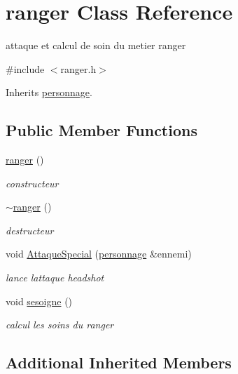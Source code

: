\hypertarget{classranger}{}\section{ranger Class Reference}
\label{classranger}


attaque et calcul de soin du metier ranger  




{\ttfamily \#include $<$ranger.\+h$>$}



Inherits \mbox{\hyperlink{classpersonnage}{personnage}}.

\subsection*{Public Member Functions}
\begin{DoxyCompactItemize}
\item 
\mbox{\hyperlink{classranger_a6f1936af8add92374cff7cf6c61264a2}{ranger}} ()
\begin{DoxyCompactList}\small\item\em constructeur \end{DoxyCompactList}\item 
\mbox{\hyperlink{classranger_af74328483dc87135af349240b1c4fbc3}{$\sim$ranger}} ()
\begin{DoxyCompactList}\small\item\em destructeur \end{DoxyCompactList}\item 
void \mbox{\hyperlink{classranger_ab460e3ff6701998d748fa9cbdb2fdf16}{Attaque\+Special}} (\mbox{\hyperlink{classpersonnage}{personnage}} \&ennemi)
\begin{DoxyCompactList}\small\item\em lance l\textquotesingle{}attaque headshot \end{DoxyCompactList}\item 
void \mbox{\hyperlink{classranger_ae8e0c15c5f2698d8018c305a10da9ac5}{sesoigne}} ()
\begin{DoxyCompactList}\small\item\em calcul les soins du ranger \end{DoxyCompactList}\end{DoxyCompactItemize}
\subsection*{Additional Inherited Members}


